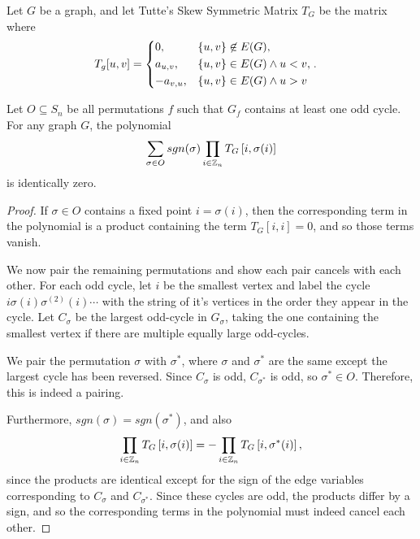 \begin{defn}
    Let $G$ be a graph, and let Tutte's Skew Symmetric Matrix $T_G$ be the matrix where
    \begin{align*}
        T_g[u, v] &= \begin{dcases}
            0, &\{u, v\} \not\in E(G), \\
            a_{u,v}, &\{u, v\} \in E(G) \land u < v, \\
            -a_{v, u}, &\{u, v\} \in E(G) \land u > v
        \end{dcases}.
    \end{align*}
\end{defn}

\begin{lemma}\label{lemma:tutte-odd-cycle-cancellation}
    Let $O \subseteq S_n$ be all permutations $f$ such that $G_f$ contains at least one odd cycle. For any graph $G$, the polynomial
    \begin{align*}
        \sum_{\sigma\in O}sgn(\sigma)\prod_{i\in\mathbb{Z}_n}T_G\left[i,\sigma(i)\right]
    \end{align*}
    is identically zero.
\end{lemma}

\begin{proof}
    If $\sigma \in O$ contains a fixed point $i = \sigma(i)$, then the corresponding term in the polynomial is a product containing the term $T_G[i,i] = 0$, and so those terms vanish.

    We now pair the remaining permutations and show each pair cancels with each other. For each odd cycle, let $i$ be the smallest vertex and label the cycle $i\sigma(i)\sigma^(2)(i)\cdots$ with the string of it's vertices in the order they appear in the cycle. Let $C_{\sigma}$ be the largest odd-cycle in $G_{\sigma}$, taking the one containing the smallest vertex if there are multiple equally large odd-cycles.

    We pair the permutation $\sigma$ with $\sigma^{*}$, where $\sigma$ and $\sigma^{*}$ are the same except the largest cycle has been reversed. Since $C_{\sigma}$ is odd, $C_{\sigma^{*}}$ is odd, so $\sigma^{*} \in O$. Therefore, this is indeed a pairing.

    Furthermore, $sgn(\sigma) = sgn(\sigma^{*})$, and also
    \begin{align*}
        \prod_{i\in\mathbb{Z}_n}T_{G}\left[i,\sigma(i)\right] = -\prod_{i\in\mathbb{Z}_n}T_{G}\left[i,\sigma^{*}(i)\right],
    \end{align*}
    since the products are identical except for the sign of the edge variables corresponding to $C_{\sigma}$ and $C_{\sigma^{*}}$. Since these cycles are odd, the products differ by a sign, and so the corresponding terms in the polynomial must indeed cancel each other.
\end{proof}

